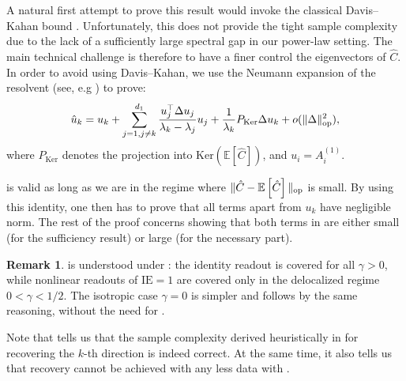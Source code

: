 \documentclass[]{article}
\makeatletter
\numberwithin{equation}{section}
\theoremstyle{definition}
\newtheorem{remark}{Remark}[section]
\renewenvironment{proof}[1][\proofname]{\par
  \pushQED{\qed}%
  \normalfont \topsep6\p@\@plus6\p@\relax
  \trivlist
  \item[\hskip\labelsep\textbf{#1.}]\ignorespaces
}{%
  \popQED\endtrivlist\@endpefalse
}
\newcommand{\EE}{\mathbb{E}}
\def\op{{\rm op}}
\makeatother
\begin{document}
\begin{proof}[Sketch of the Proof:] 
A natural first attempt to prove this result would invoke the classical Davis--Kahan bound \citep{davis1970rotation}. Unfortunately, this does not provide the tight sample complexity due to the lack of a sufficiently large spectral gap in our power-law setting. The main technical challenge is therefore to have a finer control the eigenvectors of $\hat{C}$. In order to avoid using Davis--Kahan, we use the Neumann expansion of the resolvent (see, e.g \citep{eldridge2018unperturbed, greenbaum2020first}) to prove: 
\begin{equation}
    \hat{u}_{k} = u_{k }+\sum_{j=1, j\not = k}^{d_1} \dfrac{u_{j}^{\top} \Delta u_{j}}{\lambda_{k} - \lambda_{j}} u_{j} + \dfrac{1}{\lambda_{k}}P_{\mathrm{Ker}} \Delta u_{k} + o(\| \Delta\|_\op^2),
    \label{eq:main_eigenvector_perturbation_id}
\end{equation}
where $P_{\mathrm{Ker}}$ denotes the projection into $\mathrm{Ker}(\EE[\hat{C}])$, and $u_{i} = A^{(1)}_i$. 

 is valid as long as we are in the regime where $\|\hat{C} - \EE\left[ \hat{C}\right ]\|_\op $ is small. By using this identity, one then has to prove that all terms apart from $u_{k}$ have negligible norm. The rest of the proof concerns showing that both terms in  are either small (for the sufficiency result) or large (for the necessary part). 
\end{proof}

\begin{remark}
 is understood under : the identity readout is covered for all $\gamma>0$, while nonlinear readouts of $\mathrm{IE}=1$ are covered only in the delocalized regime $0<\gamma<1/2$. The isotropic case $\gamma=0$ is simpler and follows by the same reasoning, without the need for .
\end{remark}

Note that  tells us that the sample complexity derived heuristically in  for recovering the $k$-th direction is indeed correct. At the same time, it also tells us that recovery cannot be achieved with any less data with . 
\end{document}
